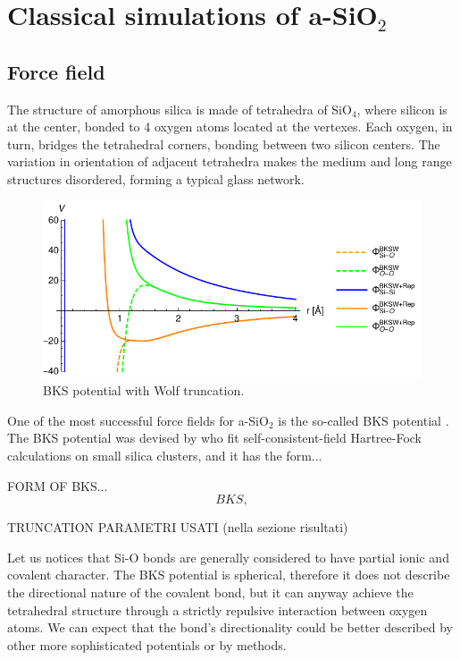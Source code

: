 \section{Classical simulations of a-SiO$_2$}  \label{sec:silica-classical}

\subsection{Force field}  \label{sec:glass-force-field}

The structure of amorphous silica is made of tetrahedra of SiO$_4$, where silicon is at the center, bonded to 4 oxygen atoms located at the vertexes. Each oxygen, in turn, bridges the tetrahedral corners, bonding between two silicon centers. The variation in orientation of adjacent tetrahedra makes the medium and long range structures disordered, forming a typical glass network.

\begin{figure}[!tb]
    \centering
    \includegraphics[]{chapters/chapter6/figures/BKSW.pdf}
    \caption{BKS potential with Wolf truncation.}
    \label{fig:BKS-potential}
\end{figure}

One of the most successful force fields for a-SiO$_2$ is the so-called BKS potential \cite{Silica-BKS-1990}. 
The BKS potential was devised by \citeauthor*{Silica-BKS-1990} who fit self-consistent-field Hartree-Fock calculations on small silica clusters, and it has the form...

FORM OF BKS...
\begin{equation}
    BKS, \label{eq:BKS-Wolf}
\end{equation}

TRUNCATION
PARAMETRI USATI (nella sezione risultati)

Let us notices that Si-O bonds are generally considered to have partial ionic and covalent character. The BKS potential is spherical, therefore it does not describe the directional nature of the covalent bond, but it can anyway achieve the tetrahedral structure through a strictly repulsive interaction between oxygen atoms. We can expect that the bond's directionality could be better described by other more sophisticated potentials or by \abinitio methods.

